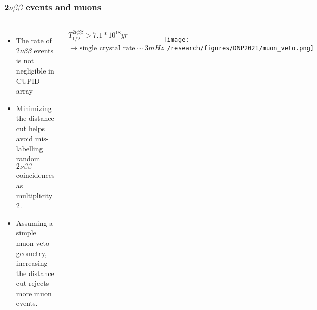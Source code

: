 \documentclass{beamer}
\begin{document}
	

	\begin{frame}
		\frametitle{2$\nu\beta\beta$ events and muons}
		\begin{columns}[c] %
			
			\begin{itemize}
				\setlength\itemsep{2em}				
				\item The rate of $2\nu\beta\beta$ events is not negligible in CUPID array
				\item Minimizing the distance cut helps avoid mis-labelling random $2\nu\beta\beta$ coincidences as multiplicity 2.
				\item Assuming a simple muon veto geometry, increasing the distance cut rejects more muon events.
			\end{itemize}
			
			\begin{eqnarray*}
			T_{1/2}^{2\nu\beta\beta} > 7.1* 10^{18} yr \\ 
			\rightarrow \text{single crystal rate} \sim 3mHz
			\end{eqnarray*}			
			
			\begin{figure}
			\texttt{[image: ~/research/figures/DNP2021/muon\_veto.png]}
			\end{figure}
			
		\end{columns}
	\end{frame}


\end{document}
